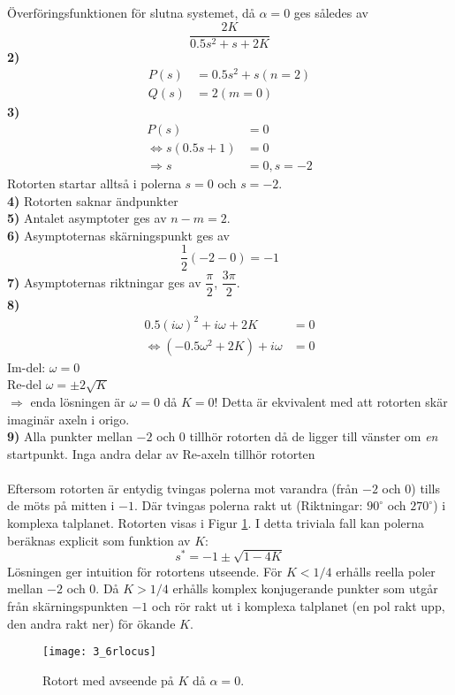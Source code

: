 \documentclass[12pt]{article}
\begin{document}
Överföringsfunktionen för slutna systemet, då $\alpha = 0$ ges således av
\[\frac{2K}{0.5s^2 + s + 2K}\]
\textbf{2)} \\
\begin{align*}
  P(s) &= 0.5s^2 + s (n = 2) \\
  Q(s) &= 2 (m = 0)
\end{align*}
\textbf{3)} \\
\begin{align*}
  P(s) &= 0 \\
  \Leftrightarrow s(0.5s+1) &= 0 \\
  \Rightarrow s &= 0, s = -2
\end{align*}
Rotorten startar alltså i polerna $s = 0$ och $s = -2$. \\
\textbf{4)} Rotorten saknar ändpunkter \\
\textbf{5)} Antalet asymptoter ges av $n-m = 2$. \\
\textbf{6)} Asymptoternas skärningspunkt ges av
\[\frac{1}{2}(-2-0) = -1\]
\textbf{7)} Asymptoternas riktningar ges av $\dfrac{\pi}{2}$, $\dfrac{3\pi}{2}$. \\
\textbf{8)} 
\begin{align*}
  0.5(i\omega)^2 + i\omega + 2K &= 0 \\
  \Leftrightarrow (-0.5\omega^2 + 2K) + i\omega &= 0
\end{align*}
Im-del: $\omega = 0$ \\
Re-del $\omega = \pm 2\sqrt{K}$ \\
$\Rightarrow$ enda lösningen är $\omega = 0$ då $K = 0$! Detta är ekvivalent med att rotorten skär imaginär axeln i origo. \\
\textbf{9)} Alla punkter mellan $-2$ och $0$ tillhör rotorten då de ligger till vänster om \emph{en} startpunkt. Inga andra delar av Re-axeln tillhör rotorten\\\\
Eftersom rotorten är entydig tvingas polerna mot varandra (från $-2$ och $0$) tills de möts på mitten i $-1$. Där tvingas polerna rakt ut (Riktningar: $90^{\circ}$ och $270^{\circ}$)  i komplexa talplanet. Rotorten visas i Figur \ref{fig:36rlocus}. I detta triviala fall kan polerna beräknas explicit som funktion av $K$:
\[s^* = -1 \pm \sqrt{1-4K}\]
Lösningen ger intuition för rotortens utseende. För $K < 1/4$ erhålls reella poler mellan $-2$ och $0$. Då $K > 1/4$ erhålls komplex konjugerande punkter som utgår från skärningspunkten $-1$ och rör rakt ut i komplexa talplanet (en pol rakt upp, den andra rakt ner) för ökande $K$.
\begin{figure}[h!]
  \centering
  \texttt{[image: 3\_6rlocus]}
  \caption{Rotort med avseende på $K$ då $\alpha = 0$.}
  \label{fig:36rlocus}
\end{figure}
\FloatBarrier
\end{document}
